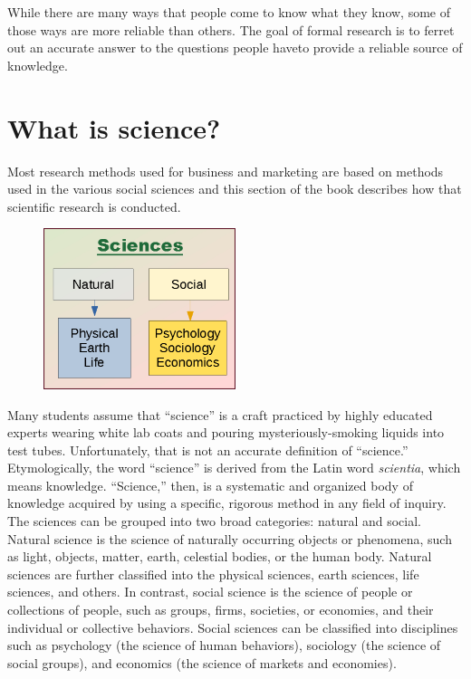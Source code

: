 While there are many ways that people come to know what they know, some of those ways are more reliable than others. The goal of formal research is to ferret out an accurate answer to the questions people have\textemdash to provide a reliable source of knowledge. 

\section{What is science?}

Most research methods used for business and marketing are based on methods used in the various social sciences and this section of the book describes how that scientific research is conducted.

\begin{figure}
	\caption*{} %
	\label{01:fig03} 
	\centering
	\includegraphics[width=0.5\textwidth]{gfx/01-sciences} 
\end{figure}

Many students assume that ``science'' is a craft practiced by highly educated experts wearing white lab coats and pouring mysteriously-smoking liquids into test tubes. Unfortunately, that is not an accurate definition of ``science.'' Etymologically, the word ``science'' is derived from the Latin word \textit{scientia}, which means knowledge. ``Science,'' then, is a systematic and organized body of knowledge acquired by using a specific, rigorous method in any field of inquiry. The sciences can be grouped into two broad categories: natural and social. Natural science is the science of naturally occurring objects or phenomena, such as light, objects, matter, earth, celestial bodies, or the human body. Natural sciences are further classified into the physical sciences, earth sciences, life sciences, and others. In contrast, social science is the science of people or collections of people, such as groups, firms, societies, or economies, and their individual or collective behaviors. Social sciences can be classified into disciplines such as psychology (the science of human behaviors), sociology (the science of social groups), and economics (the science of markets and economies).

